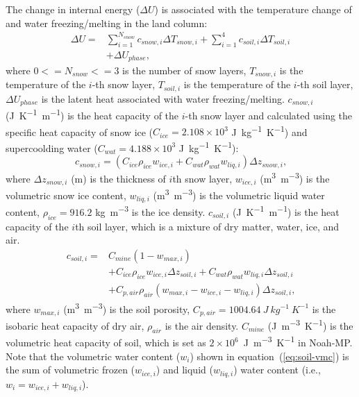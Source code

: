 \documentclass[essd]{copernicus}
\begin{document}
The change in internal energy ($\Delta U$) is associated with the temperature change of and water freezing/melting in the land column:
\begin{equation}
    \begin{split}
        \Delta U = & \sum_{i=1}^{N_{snow}} c_{snow,i} \Delta T_{snow,i} + \sum_{i=1}^{4} c_{soil,i} \Delta T_{soil,i} \\
        & + \Delta U_{phase} \text{,}
    \end{split}
\end{equation}
where $0<=N_{snow}<=3$ is the number of snow layers, $T_{snow,i}$ is the temperature of the $i$-th snow layer, $T_{soil,i}$ is the temperature of the $i$-th soil layer, $\Delta U_{phase}$ is the latent heat associated with water freezing/melting.
$c_{snow,i}$ (\unit{J~K^{-1}~m^{-1}}) is the heat capacity of the $i$-th snow layer and calculated using the specific heat capacity of snow ice ($C_{ice} = 2.108 \times 10^3$ \unit{J~kg^{-1}~K^{-1}}) and supercoolding water ($C_{wat} = 4.188 \times 10^3$ \unit{J~kg^{-1}~K^{-1}}):
\begin{equation}
    c_{snow,i} = ( C_{ice} \rho_{ice} w_{ice,i} + C_{wat} \rho_{wat} w_{liq,i} ) \Delta z_{snow,i} \text{,}
\end{equation}
where $\Delta z_{snow,i}$ (\unit{m}) is the thickness of $i$th snow layer, $w_{ice,i}$ (\unit{m^3~m^{-3}}) is the volumetric snow ice content, $w_{liq,i}$ (\unit{m^3~m^{-3}}) is the volumetric liquid water content, $\rho_{ice} = 916.2$ \unit{kg~m^{-3}} is the ice density.
$c_{soil,i}$ (\unit{J~K^{-1}~m^{-1}}) is the heat capacity of the $i$th soil layer, which is a mixture of dry matter, water, ice, and air.
\begin{equation}
    \begin{split}
        c_{soil,i} = & C_{mine} (1 - w_{max,i}) \\
        & + C_{ice} \rho_{ice} w_{ice,i} \Delta z_{soil,i}
        + C_{wat} \rho_{wat} w_{liq,i} \Delta z_{soil,i} \\
        & + C_{p,air} \rho_{air} (w_{max,i} - w_{ice,i} - w_{liq,i}) \Delta z_{soil,i} \text{,}
    \end{split}
\end{equation}
where $w_{max,i}$ (\unit{m^3~m^{-3}}) is the soil porosity, $C_{p,air} = 1004.64~\unit{J~kg^{-1}~K^{-1}}$ is the isobaric heat capacity of dry air, $\rho_{air}$ is the air density. $C_{mine}$ (\unit{J~m^{-3}~K^{-1}}) is the volumetric heat capacity of soil, which is set as $2\times10^6$~\unit{J~m^{-3}~K^{-1}} in Noah-MP. Note that the volumetric water content ($w_{i}$) shown in equation~(\ref{eq:soil-vmc}) is the sum of volumetric frozen ($w_{ice,i}$) and liquid ($w_{liq,i}$) water content (i.e., $w_{i} = w_{ice,i} + w_{liq,i}$).
\end{document}
